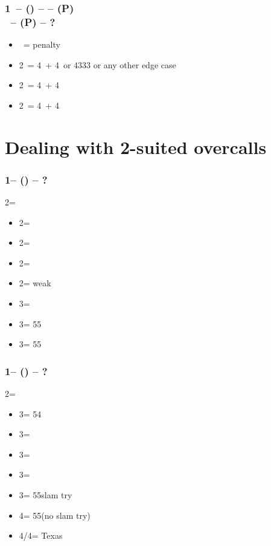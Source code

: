 \documentclass[12pt, a4paper]{report}
\begin{document}
{{{            \subsubsection*{1\ntx\ -- (\dbl) --  -- (P)\\
                            \rdbl\ -- (P) -- ?}
            \begin{itemize}
                \item \pass\ = penalty
                \item 2\clubs\ = 4\clubs\ + 4\ or 4333 or any other edge case
                \item 2\diams\ = 4\diams\ + 4\major
                \item 2\hearts\ = 4\hearts\ + 4\spades
            \end{itemize}

        }

        \section*{\colorbox{blue!30}{Dealing with 2-suited overcalls}}
         {

            \subsubsection*{1\clubs -- (\alrts{2\minor}) -- ?}
            2\minor = \major
            \begin{itemize}
                \item 2\diams = \nat\ \nf
                \item 2\hearts = \clubs\ \invp
                \item 2\spades = \diams\ \invp
                \item 2\nt = \minor weak
                \item 3\minor = \nat\ \nf
                \item 3\hearts = 55\minor\ \gf
                \item 3\spades = 55\minor\ \inv
            \end{itemize}

            \subsubsection*{1\clubs -- (\alrts{2\nt}) -- ?}
            2\nt = \minor
            \begin{itemize}
                \item 3\clubs = 54\major\ \gf
                \item 3\diams = \hearts\ \invp
                \item 3\hearts = \spades\ \invp
                \item 3\spades = \trsf{\nt}
                \item 3\nt = 55\major slam try
                \item 4\clubs = 55\major (no slam try)
                \item 4\diams/4\hearts = Texas
            \end{itemize}

}}}
\end{document}

